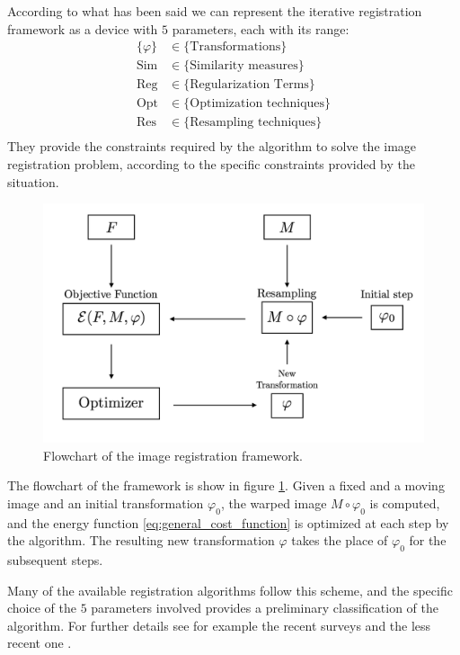 According to what has been said we can represent the iterative registration framework as a device with $5$ parameters, each with its range:
\begin{align*}
\{  \varphi \} &\in \{ \text{Transformations}\}\\
\text{Sim} &\in \{ \text{Similarity measures}\}\\
\text{Reg} &\in \{ \text{Regularization Terms}\}\\
\text{Opt} &\in \{ \text{Optimization techniques}\}\\
\text{Res} &\in \{ \text{Resampling techniques}\}\\
\end{align*}
They provide the constraints required by the algorithm to solve the image registration problem, according to the specific constraints provided by the situation. 
\begin{figure}[!ht]
	\centering
	\includegraphics[scale=0.235]{figures/iterative_algorithm.png}
	\caption{Flowchart of the image registration framework.}
	\label{fig:iterative_algorithm_scheme}
\end{figure}
The flowchart of the framework is show in figure \ref{fig:iterative_algorithm_scheme}. Given a fixed and a moving image and an initial transformation $\varphi_0$, the warped image $M\circ\varphi_{0}$ is computed, and the 
energy function \ref{eq:general_cost_function} is optimized at each step by the algorithm. The resulting new transformation $\varphi$ takes the place of $\varphi_0$ for the subsequent steps.

Many of the available registration algorithms follow this scheme, and the specific choice of the $5$ parameters involved provides a preliminary classification of the algorithm.
For further details see for example the recent surveys \cite{Sotiras:survey:13} and the less recent one \cite{zitova2003image}. 

